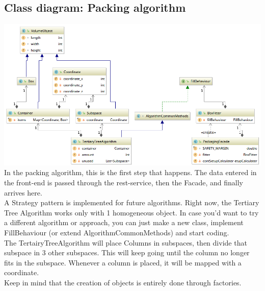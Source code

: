 \documentclass[a4paper,12pt]{article}
\begin{document}
\pagebreak

\subsection{Class diagram: Packing algorithm}
\includegraphics[width=17cm]{Class_diagram_packing_classes.png}\\
In the packing algorithm, this is the first step that happens. The data entered in the front-end is passed through the rest-service, then the Facade, and finally arrives here. \\

A Strategy pattern is implemented for future algorithms. Right now, the Tertiary Tree Algorithm works only with 1 homogeneous object. In case you'd want to try a different algorithm or approach, you can just make a new class, implement FillBehaviour (or extend AlgorithmCommonMethods) and start coding. \\

The TertairyTreeAlgorithm will place Columns in subspaces, then divide that subspace in 3 other subspaces. This will keep going until the column no longer fits in the subspace. Whenever a column is placed, it will be mapped with a coordinate. \\

Keep in mind that the creation of objects is entirely done through factories.

\pagebreak
\end{document}
